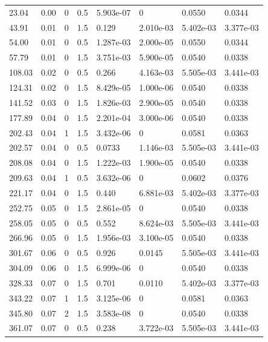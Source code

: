 \documentclass[preview]{standalone}
\begin{document}
{{\begin{tabular}{L{1.2cm}C{1.2cm} C{0.3cm}C{0.5cm} C{1.4cm}C{1.4cm} C{1.4cm}C{1.4cm}}
  23.04  &  0.00  & 0     & 0.5 &  5.903e-07  & 0  & 0.0550 &  0.0344   \\ 
  43.91  &  0.01  & 0     & 1.5 &  0.129  & 2.010e-03  & 5.402e-03 &  3.377e-03   \\ 
  54.00  &  0.01  & 0     & 0.5 &  1.287e-03  & 2.000e-05  & 0.0550 &  0.0344   \\ 
  57.79  &  0.01  & 0     & 1.5 &  3.751e-03  & 5.900e-05  & 0.0540 &  0.0338   \\ 
  108.03  &  0.02  & 0     & 0.5 &  0.266  & 4.163e-03  & 5.505e-03 &  3.441e-03   \\ 
  124.31  &  0.02  & 0     & 1.5 &  8.429e-05  & 1.000e-06  & 0.0540 &  0.0338   \\ 
  141.52  &  0.03  & 0     & 1.5 &  1.826e-03  & 2.900e-05  & 0.0540 &  0.0338   \\ 
  177.89  &  0.04  & 0     & 1.5 &  2.201e-04  & 3.000e-06  & 0.0540 &  0.0338   \\ 
  202.43  &  0.04  & 1     & 1.5 &  3.432e-06  & 0  & 0.0581 &  0.0363   \\ 
  202.57  &  0.04  & 0     & 0.5 &  0.0733  & 1.146e-03  & 5.505e-03 &  3.441e-03   \\ 
  208.08  &  0.04  & 0     & 1.5 &  1.222e-03  & 1.900e-05  & 0.0540 &  0.0338   \\ 
  209.63  &  0.04  & 1     & 0.5 &  3.632e-06  & 0  & 0.0602 &  0.0376   \\ 
  221.17  &  0.04  & 0     & 1.5 &  0.440  & 6.881e-03  & 5.402e-03 &  3.377e-03   \\ 
  252.75  &  0.05  & 0     & 1.5 &  2.861e-05  & 0  & 0.0540 &  0.0338   \\ 
  258.05  &  0.05  & 0     & 0.5 &  0.552  & 8.624e-03  & 5.505e-03 &  3.441e-03   \\ 
  266.96  &  0.05  & 0     & 1.5 &  1.956e-03  & 3.100e-05  & 0.0540 &  0.0338   \\ 
  301.67  &  0.06  & 0     & 0.5 &  0.926  & 0.0145  & 5.505e-03 &  3.441e-03   \\ 
  304.09  &  0.06  & 0     & 1.5 &  6.999e-06  & 0  & 0.0540 &  0.0338   \\ 
  328.33  &  0.07  & 0     & 1.5 &  0.701  & 0.0110  & 5.402e-03 &  3.377e-03   \\ 
  343.22  &  0.07  & 1     & 1.5 &  3.125e-06  & 0  & 0.0581 &  0.0363   \\ 
  345.80  &  0.07  & 2     & 1.5 &  3.583e-08  & 0  & 0.0540 &  0.0338   \\ 
  361.07  &  0.07  & 0     & 0.5 &  0.238  & 3.722e-03  & 5.505e-03 &  3.441e-03   \\ 

\end{tabular}}}
\end{document}
